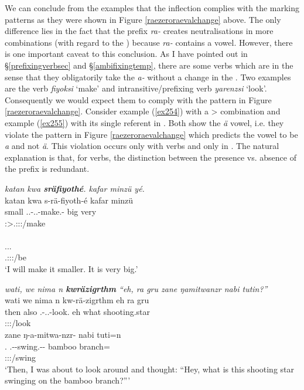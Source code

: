 We can conclude from the examples that the  inflection complies with the  marking patterns as they were shown in Figure \ref{raezeroraevalchange} above. The only difference lies in the fact that the  prefix \emph{ra-} creates neutralisations in more combinations (with regard to the ) because \emph{ra-} contains a vowel. However, there is one important caveat to this conclusion. As I have pointed out in \S{}\ref{prefixingverbsec} and \S{}\ref{ambifixingtemp}, there are some verbs which are  in the sense that they obligatorily take the \emph{a-} without a change in the . Two examples are the  verb \emph{fiyoksi} `make' and intransitive/prefixing verb \emph{yarenzsi} `look'. Consequently we would expect them to comply with the pattern in Figure \ref{raezeroraevalchange}. Consider example (\ref{ex254}) with a \Sg>\Sg{}  combination and example (\ref{ex255}) with its single referent in \Sg{}. Both show the \emph{ä}  vowel, i.e. they violate the pattern in Figure \ref{raezeroraevalchange} which predicts the vowel to be \emph{a} and not \emph{ä}. This violation occurs only with  verbs and only in  . The natural explanation is that, for  verbs, the distinction between the presence vs. absence of the  prefix is redundant.

\begin{exe}
	\ex \emph{katan kwa \textbf{sräfiyothé}. kafar minzü yé.}\\
	\glll katan kwa s-rä-fiyoth-é kafar minzü\\
	small \Fut{} \Tsg.\Masc.\Bet-\Irr.\Ndu.\Vc-make.\Rs-\Fsg{} big very\\
	{} {} \footnotesize{\Fsg:\Sbj>\Tsg.\Masc:\Obj:\Irr:\Pfv/make} {} {}\\
	\sn
	\glll {}\\
	\Tsg.\Masc.\Cop.\Ndu\\
	\footnotesize{\Tsg.\Masc:\Sbj:\Nonpast:\Ipfv/be}\\
	\trans `I will make it smaller. It is very big.' 
	\label{ex254}
\end{exe}
\begin{exe}
	\ex \emph{wati, we nima n \textbf{kwräzigrthm} ``eh, ra gru zane ŋamitwanzr nabi tutin?''}\\
	\glll wati we nima n kw-rä-zigrthm eh ra gru\\
	then also \Quot{} \Imn{} \Fsg.\Bet-\Irr.\Ndu.\Vc-look.\Rs{} eh what shooting.star\\
	{} {} {} {} \footnotesize{\Fsg:\Sbj:\Irr:\Pfv/look} {} {} {}\\
	\sn
	\glll zane ŋ-a-mitwa-nzr-\Zero{} nabi tuti=n\\
	\Dem.\Prox{} \M.\Alph-\Vc-swing.\Ext-\Ndu-\Stsg{} bamboo branch=\Loc{}\\
	{} \footnotesize{\Stsg:\Sbj:\Nonpast:\Ipfv/swing} {} {}\\
	\trans `Then, I was about to look around and thought: ``Hey, what is this shooting star swinging on the bamboo branch?''' 
	\label{ex255}
\end{exe}

